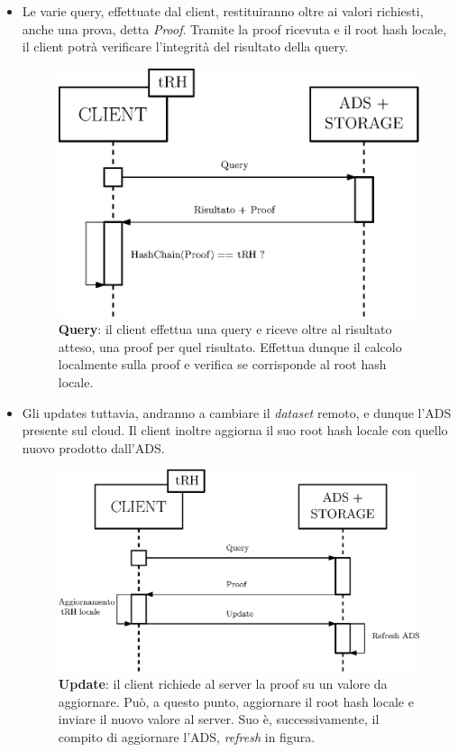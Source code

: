 		\begin{itemize}
			\item Le varie query, effettuate dal client, restituiranno oltre ai valori richiesti, anche una prova, detta \textit{Proof}. Tramite la proof ricevuta e il root hash locale, il client potrà verificare l'integrità del risultato della query.
			
			\begin{figure}
				\centering
				\includegraphics[scale=0.75]{figure/queryADS.eps}
				\caption{\textbf{Query}: il client effettua una query e riceve oltre al risultato atteso, una proof per quel risultato. Effettua dunque il calcolo localmente sulla proof e verifica se corrisponde al root hash locale.}\label{fig:4}
			\end{figure}
			
			\item Gli updates tuttavia, andranno a cambiare il \textit{dataset} remoto, e dunque l'ADS presente sul cloud. Il client inoltre aggiorna il suo root hash locale con quello nuovo prodotto dall'ADS.
			
			\begin{figure}
				\centering
				\includegraphics[scale=0.75]{figure/updateADS.eps}
				\caption{\textbf{Update}: il client richiede al server la proof su un valore da aggiornare. Può, a questo punto, aggiornare il root hash locale e inviare il nuovo valore al server. Suo è, successivamente, il compito di aggiornare l'ADS, \textit{refresh} in figura.}\label{fig:5}
			\end{figure}
		
		\end{itemize}
	
